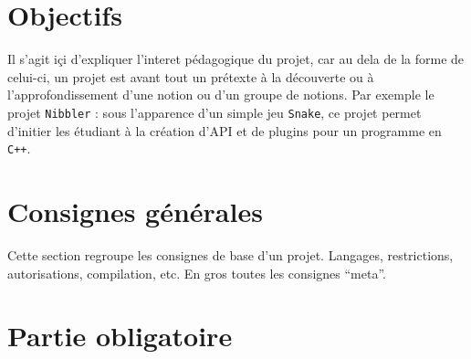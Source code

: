 \documentclass{42}
\begin{document}
\chapter{Objectifs}

    Il s'agit i\c ci d'expliquer l'interet p\'edagogique du projet,
    car au dela de la forme de celui-ci, un projet est avant tout un
    pr\'etexte \`a la d\'ecouverte ou \`a l'approfondissement d'une
    notion ou d'un groupe de notions. Par exemple le projet
    \texttt{Nibbler} : sous l'apparence d'un simple jeu
    \texttt{Snake}, ce projet permet d'initier les \'etudiant \`a la
    cr\'eation d'API et de plugins pour un programme en \texttt{C++}.



\chapter{Consignes g\'en\'erales}

    Cette section regroupe les consignes de base d'un
    projet. Langages, restrictions, autorisations, compilation,
    etc. En gros toutes les consignes ``meta''.



\chapter{Partie obligatoire}
\end{document}
